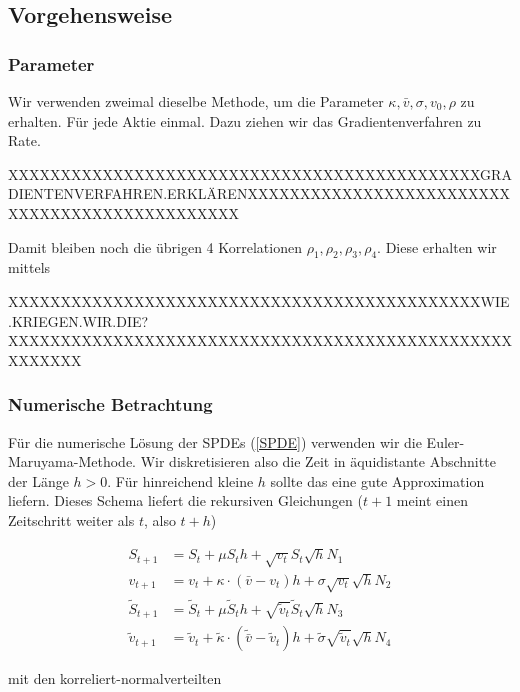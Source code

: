 \documentclass[12pt]{article}
\begin{document}
\subsection{Vorgehensweise}

\subsubsection{Parameter}

Wir verwenden zweimal dieselbe Methode, um die Parameter $\kappa, \bar{v}, \sigma, v_0, \rho$ zu erhalten. Für jede Aktie einmal. Dazu ziehen wir das Gradientenverfahren zu Rate.

XXXXXXXXXXXXXXXXXXXXXXXXXXXXXXXXXXXXXXXXXXXXXGRADIENTENVERFAHREN.ERKLÄRENXXXXXXXXXXXXXXXXXXXXXXXXXXXXXXXXXXXXXXXXXXXXXXX

Damit bleiben noch die übrigen 4 Korrelationen $\rho_1, \rho_2, \rho_3,\rho_4$. Diese erhalten wir mittels

XXXXXXXXXXXXXXXXXXXXXXXXXXXXXXXXXXXXXXXXXXXXXWIE.KRIEGEN.WIR.DIE?XXXXXXXXXXXXXXXXXXXXXXXXXXXXXXXXXXXXXXXXXXXXXXXXXXXXXXX


\subsubsection{Numerische Betrachtung}

Für die numerische Lösung der SPDEs (\ref{SPDE}) verwenden wir die Euler-Maruyama-Methode. Wir diskretisieren also die Zeit in äquidistante Abschnitte der Länge $h>0$. Für hinreichend kleine $h$ sollte das eine gute Approximation liefern. Dieses Schema liefert die rekursiven Gleichungen ($t+1$ meint einen Zeitschritt weiter als $t$, also $t+h$)

\begin{align} \label{EMSPDE}
S_{t+1} &= S_t +\mu S_t h + \sqrt{v_t} S_t \sqrt{h} N_1 \\
v_{t+1} &= v_t +\kappa\cdot(\bar{v}-v_t) h + \sigma\sqrt{v_t}\sqrt{h} N_2\\
\tilde{S}_{t+1} &= \tilde{S}_t +\mu \tilde{S}_t h + \sqrt{\tilde{v}_t} \tilde{S}_t \sqrt{h} N_3 \\
\tilde{v}_{t+1} &= \tilde{v}_t +\tilde{\kappa}\cdot(\tilde{\bar{v}}-\tilde{v}_t) h + \tilde{\sigma}\sqrt{\tilde{v}_t}\sqrt{h} N_4
\end{align}

mit den korreliert-normalverteilten
\end{document}
